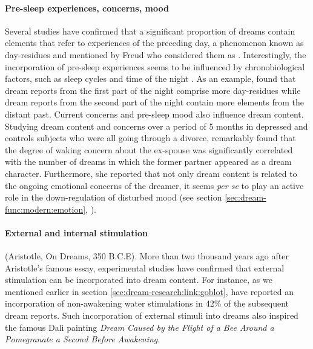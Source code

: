 \paragraph{Pre-sleep experiences, concerns, mood}

Several studies \citep{botman_dream_1990, nielsen_day-residue_1992, marquardt_empirical_1996} have confirmed that a significant proportion of dreams contain elements that refer to experiences of the preceding day, a phenomenon known as day-residues and mentioned by Freud who considered them as  \citep{freud_interpretation_1900}. Interestingly, the incorporation of pre-sleep experiences seems to be influenced by chronobiological factors, such as sleep cycles and time of the night \citep{malinowski_effect_2014}. As an example, \citet{roffwarg_effects_1978} found that dream reports from the first part of the night comprise more day-residues while dream reports from the second part of the night contain more elements from the distant past.
Current concerns and pre-sleep mood also influence dream content. Studying dream content and concerns over a period of 5 months in depressed and controls subjects who were all going through a divorce, \citet{cartwright_relation_2006} remarkably found that the degree of waking concern about the ex-spouse was significantly correlated with the number of dreams in which the former partner appeared as a dream character. Furthermore, she reported that not only dream content is related to the ongoing emotional concerns of the dreamer, it seems \emph{per se} to play an active role in the down-regulation of disturbed mood (see section \ref{sec:dream-func:modern:emotion}, \citealp{cartwright_dreams_1991, cartwright_role_1998, cartwright_role_1998, cartwright_relation_2006}).

\paragraph{External and internal stimulation}

 (Aristotle, On Dreams, 350 B.C.E). More than two thousand years ago after Aristotle's famous essay, experimental studies have confirmed that external stimulation can be incorporated into dream content. For instance, as we mentioned earlier in section \ref{sec:dream-research:link:goblot}, \citet{dement_relation_1958} have reported an incorporation of non-awakening water stimulations in 42\% of the subsequent dream reports. Such incorporation of external stimuli into dreams also inspired the famous Dali painting \emph{Dream Caused by the Flight of a Bee Around a Pomegranate a Second Before Awakening}.
